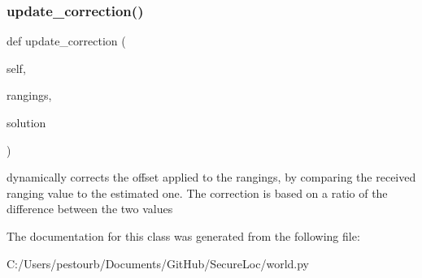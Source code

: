 \subsubsection{\texorpdfstring{update\+\_\+correction()}{update\_correction()}}
{\footnotesize\ttfamily def update\+\_\+correction (\begin{DoxyParamCaption}\item[{}]{self,  }\item[{}]{rangings,  }\item[{}]{solution }\end{DoxyParamCaption})}

\begin{DoxyVerb}dynamically corrects the offset applied to the rangings, by comparing the received ranging value to the estimated one.
    The correction is based on a ratio of the difference between the two values\end{DoxyVerb}
 

The documentation for this class was generated from the following file\+:\begin{DoxyCompactItemize}
\item 
C\+:/\+Users/pestourb/\+Documents/\+Git\+Hub/\+Secure\+Loc/world.\+py\end{DoxyCompactItemize}
